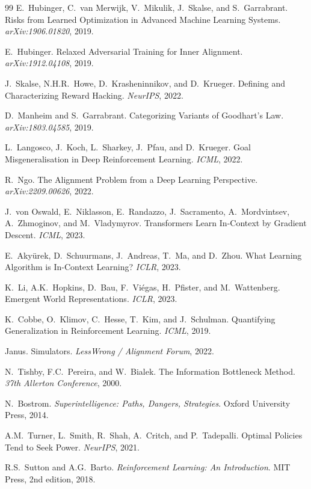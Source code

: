 \documentclass[11pt,a4paper]{article}
\theoremstyle{definition}
\begin{document}
\begin{thebibliography}{99}
E.~Hubinger, C.~van Merwijk, V.~Mikulik, J.~Skalse, and S.~Garrabrant.
\newblock Risks from Learned Optimization in Advanced Machine Learning
  Systems.
\newblock \textit{arXiv:1906.01820}, 2019.

E.~Hubinger.
\newblock Relaxed Adversarial Training for Inner Alignment.
\newblock \textit{arXiv:1912.04108}, 2019.

J.~Skalse, N.H.R.~Howe, D.~Krasheninnikov, and D.~Krueger.
\newblock Defining and Characterizing Reward Hacking.
\newblock \textit{NeurIPS}, 2022.

D.~Manheim and S.~Garrabrant.
\newblock Categorizing Variants of Goodhart's Law.
\newblock \textit{arXiv:1803.04585}, 2019.

L.~Langosco, J.~Koch, L.~Sharkey, J.~Pfau, and D.~Krueger.
\newblock Goal Misgeneralisation in Deep Reinforcement Learning.
\newblock \textit{ICML}, 2022.

R.~Ngo.
\newblock The Alignment Problem from a Deep Learning Perspective.
\newblock \textit{arXiv:2209.00626}, 2022.

J.~von Oswald, E.~Niklasson, E.~Randazzo, J.~Sacramento,
  A.~Mordvintsev, A.~Zhmoginov, and M.~Vladymyrov.
\newblock Transformers Learn In-Context by Gradient Descent.
\newblock \textit{ICML}, 2023.

E.~Aky\"urek, D.~Schuurmans, J.~Andreas, T.~Ma, and D.~Zhou.
\newblock What Learning Algorithm is In-Context Learning?
\newblock \textit{ICLR}, 2023.

K.~Li, A.K.~Hopkins, D.~Bau, F.~Vi\'egas, H.~Pfister, and
  M.~Wattenberg.
\newblock Emergent World Representations.
\newblock \textit{ICLR}, 2023.

K.~Cobbe, O.~Klimov, C.~Hesse, T.~Kim, and J.~Schulman.
\newblock Quantifying Generalization in Reinforcement Learning.
\newblock \textit{ICML}, 2019.

Janus.
\newblock Simulators.
\newblock \textit{LessWrong / Alignment Forum}, 2022.

N.~Tishby, F.C.~Pereira, and W.~Bialek.
\newblock The Information Bottleneck Method.
\newblock \textit{37th Allerton Conference}, 2000.

N.~Bostrom.
\newblock \textit{Superintelligence: Paths, Dangers, Strategies}.
\newblock Oxford University Press, 2014.

A.M.~Turner, L.~Smith, R.~Shah, A.~Critch, and P.~Tadepalli.
\newblock Optimal Policies Tend to Seek Power.
\newblock \textit{NeurIPS}, 2021.

R.S.~Sutton and A.G.~Barto.
\newblock \textit{Reinforcement Learning: An Introduction}.
\newblock MIT Press, 2nd edition, 2018.

\end{thebibliography}
\endgroup
\end{document}
